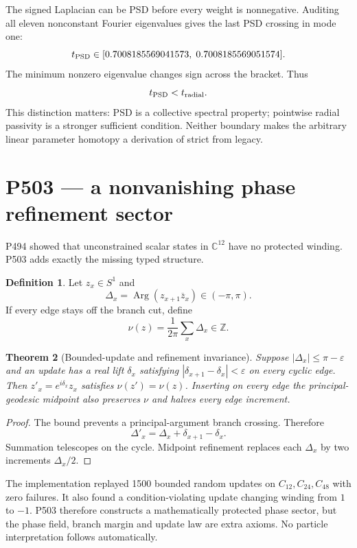 \documentclass[11pt,a4paper]{article}
\newtheorem{theorem}{Theorem}[section]
\theoremstyle{definition}
\newtheorem{definition}[theorem]{Definition}
\theoremstyle{remark}
\newcommand{\C}{\mathbb C}
\newcommand{\Z}{\mathbb Z}
\begin{document}
The signed Laplacian can be PSD before every weight is nonnegative. Auditing all eleven nonconstant Fourier eigenvalues gives the last PSD crossing in mode one:
\[
 t_{\rm PSD}\in[0.7008185569041573,\;0.7008185569051574].
\]
The minimum nonzero eigenvalue changes sign across the bracket. Thus
\[
 t_{\rm PSD}<t_{\rm radial}.
\]
This distinction matters: PSD is a collective spectral property; pointwise radial passivity is a stronger sufficient condition. Neither boundary makes the arbitrary linear parameter homotopy a derivation of strict from legacy.

\section{P503 --- a nonvanishing phase refinement sector}

P494 showed that unconstrained scalar states in $\C^{12}$ have no protected winding. P503 adds exactly the missing typed structure.

\begin{definition}
Let $z_x\in S^1$ and
\[
 \Delta_x=\operatorname{Arg}(z_{x+1}\overline z_x)\in(-\pi,\pi).
\]
If every edge stays off the branch cut, define
\[
 \nu(z)=\frac1{2\pi}\sum_x\Delta_x\in\Z.
\]
\end{definition}

\begin{theorem}[Bounded-update and refinement invariance]
Suppose $|\Delta_x|\le\pi-\varepsilon$ and an update has a real lift $\delta_x$ satisfying $|\delta_{x+1}-\delta_x|<\varepsilon$ on every cyclic edge. Then $z'_x=e^{i\delta_x}z_x$ satisfies $\nu(z')=\nu(z)$. Inserting on every edge the principal-geodesic midpoint also preserves $\nu$ and halves every edge increment.
\end{theorem}
\begin{proof}
The bound prevents a principal-argument branch crossing. Therefore
\[
 \Delta'_x=\Delta_x+\delta_{x+1}-\delta_x.
\]
Summation telescopes on the cycle. Midpoint refinement replaces each $\Delta_x$ by two increments $\Delta_x/2$.
\end{proof}

The implementation replayed 1500 bounded random updates on $C_{12},C_{24},C_{48}$ with zero failures. It also found a condition-violating update changing winding from $1$ to $-1$. P503 therefore constructs a mathematically protected phase sector, but the phase field, branch margin and update law are extra axioms. No particle interpretation follows automatically.
\end{document}
